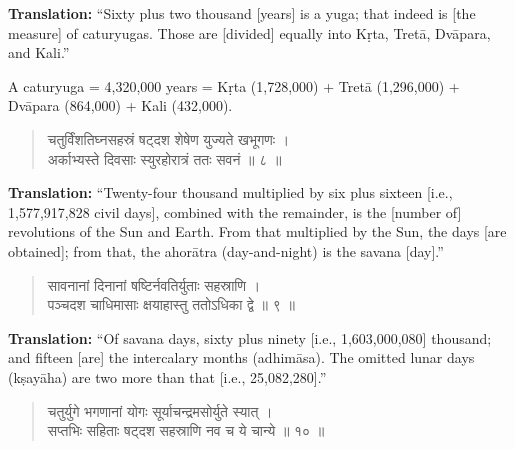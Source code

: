 \documentclass[11pt,a4paper]{article}
\newcommand{\dev}[1]{{\devanagarifont #1}}
\newenvironment{sanskritverse}{\begin{verse}\devanagarifont\large\centering}{\end{verse}}
\begin{document}
\vspace{0.3cm}
\noindent\textbf{Translation:} ``Sixty plus two thousand [years] is a yuga; that indeed is [the measure] of caturyugas. Those are [divided] equally into Kṛta, Tretā, Dvāpara, and Kali.''

\smallskip
\noindent A caturyuga = 4,320,000 years = Kṛta (1,728,000) + Tretā (1,296,000) + Dvāpara (864,000) + Kali (432,000).

\vspace{0.5cm}

\begin{tcolorbox}[colback=white,colframe=rulecolor,title={\dev{\textbf{दशगीतिका ८ — अहोर्गणाभगणाः}}}]
\begin{sanskritverse}
\dev{चतुर्विंशतिघ्नसहस्रं षट्‌दश शेषेण युज्यते खभूगणः ।\\
अर्काभ्यस्ते दिवसाः स्युरहोरात्रं ततः सवनं ॥ ८ ॥}
\end{sanskritverse}
\end{tcolorbox}

\vspace{0.3cm}
\noindent\textbf{Translation:} ``Twenty-four thousand multiplied by six plus sixteen [i.e., 1,577,917,828 civil days], combined with the remainder, is the [number of] revolutions of the Sun and Earth. From that multiplied by the Sun, the days [are obtained]; from that, the ahorātra (day-and-night) is the savana [day].''

\vspace{0.5cm}

\begin{tcolorbox}[colback=white,colframe=rulecolor,title={\dev{\textbf{दशगीतिका ९ — अधिमासक्षयाहाः}}}]
\begin{sanskritverse}
\dev{सावनानां दिनानां षष्टिर्नवतिर्युताः सहस्राणि ।\\
पञ्चदश चाधिमासाः क्षयाहास्तु ततोऽधिका द्वे ॥ ९ ॥}
\end{sanskritverse}
\end{tcolorbox}

\vspace{0.3cm}
\noindent\textbf{Translation:} ``Of savana days, sixty plus ninety [i.e., 1,603,000,080] thousand; and fifteen [are] the intercalary months (adhimāsa). The omitted lunar days (kṣayāha) are two more than that [i.e., 25,082,280].''

\vspace{0.5cm}

\begin{tcolorbox}[colback=white,colframe=rulecolor,title={\dev{\textbf{दशगीतिका १० — ग्रहयोगभगणाः}}}]
\begin{sanskritverse}
\dev{चतुर्युगे भगणानां योगः सूर्याचन्द्रमसोर्युते स्यात् ।\\
सप्तभिः सहिताः षट्‌दश सहस्राणि नव च ये चान्ये ॥ १० ॥}
\end{sanskritverse}
\end{tcolorbox}
\end{document}
